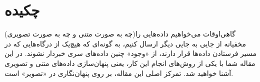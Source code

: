 \section*{چکیده}

گاهی‌اوقات می‌خواهیم داده‌هایی را(چه به صورت متنی و چه به صورت تصویری) مخفیانه از جایی به جایی دیگر ارسال کنیم، به گونه‌ای که هیچ‌یک از درگاه‌هایی که در مسیر فرستادن داده‌ها قرار دارند، از «وجود» چنین داده‌های سری خبردار نشوند. در این مقاله شما با یکی از روش‌های انجام این کار، یعنی پنهان‌سازی داده‌های متنی و تصویری آشنا خواهید شد. تمرکز اصلی این مقاله، بر روی پنهان‌نگاری در «تصویر» است.


\cleardoublepage 